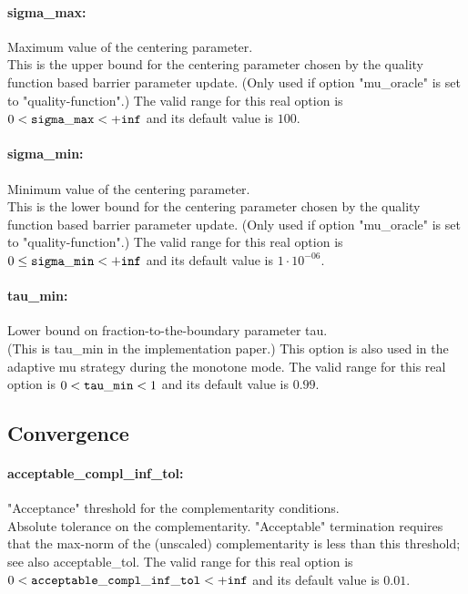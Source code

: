 \paragraph{sigma\_max:}\label{sec:sigma_max} Maximum value of the centering parameter. $\;$ \\
 This is the upper bound for the centering
parameter chosen by the quality function based
barrier parameter update. (Only used if option
"mu\_oracle" is set to "quality-function".) The valid range for this real option is 
$0 <  {\tt sigma\_max } <  {\tt +inf}$
and its default value is $100$.


\paragraph{sigma\_min:}\label{sec:sigma_min} Minimum value of the centering parameter. $\;$ \\
 This is the lower bound for the centering
parameter chosen by the quality function based
barrier parameter update. (Only used if option
"mu\_oracle" is set to "quality-function".) The valid range for this real option is 
$0 \le {\tt sigma\_min } <  {\tt +inf}$
and its default value is $1 \cdot 10^{-06}$.


\paragraph{tau\_min:}\label{sec:tau_min} Lower bound on fraction-to-the-boundary parameter tau. $\;$ \\
 (This is tau\_min in the implementation paper.) 
This option is also used in the adaptive mu
strategy during the monotone mode. The valid range for this real option is 
$0 <  {\tt tau\_min } <  1$
and its default value is $0.99$.


\subsection{Convergence}
\label{sec:Convergence}
\paragraph{acceptable\_compl\_inf\_tol:}\label{sec:acceptable_compl_inf_tol} "Acceptance" threshold for the complementarity conditions. $\;$ \\
 Absolute tolerance on the complementarity.
"Acceptable" termination requires that the
max-norm of the (unscaled) complementarity is
less than this threshold; see also
acceptable\_tol. The valid range for this real option is 
$0 <  {\tt acceptable\_compl\_inf\_tol } <  {\tt +inf}$
and its default value is $0.01$.


